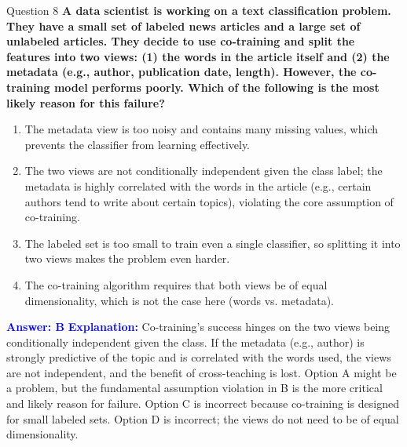 \documentclass[8pt]{beamer}  %
\begin{document}
	\begin{frame}{Question 8}
		\textbf{A data scientist is working on a text classification problem. They have a small set of labeled news articles and a large set of unlabeled articles. They decide to use co-training and split the features into two views: (1) the words in the article itself and (2) the metadata (e.g., author, publication date, length). However, the co-training model performs poorly. Which of the following is the most likely reason for this failure?}
		\begin{enumerate}
			\item The metadata view is too noisy and contains many missing values, which prevents the classifier from learning effectively.
			\item The two views are not conditionally independent given the class label; the metadata is highly correlated with the words in the article (e.g., certain authors tend to write about certain topics), violating the core assumption of co-training.
			\item The labeled set is too small to train even a single classifier, so splitting it into two views makes the problem even harder.
			\item The co-training algorithm requires that both views be of equal dimensionality, which is not the case here (words vs. metadata).
		\end{enumerate}
		\vspace{0.2cm}
		\textcolor{blue}{\textbf{Answer: B}}
		\vspace{0.2cm}
		\textcolor{blue}{\textbf{Explanation:}} Co-training's success hinges on the two views being conditionally independent given the class. If the metadata (e.g., author) is strongly predictive of the topic and is correlated with the words used, the views are not independent, and the benefit of cross-teaching is lost. Option A might be a problem, but the fundamental assumption violation in B is the more critical and likely reason for failure. Option C is incorrect because co-training is designed for small labeled sets. Option D is incorrect; the views do not need to be of equal dimensionality.
	\end{frame}
	
\end{document}

